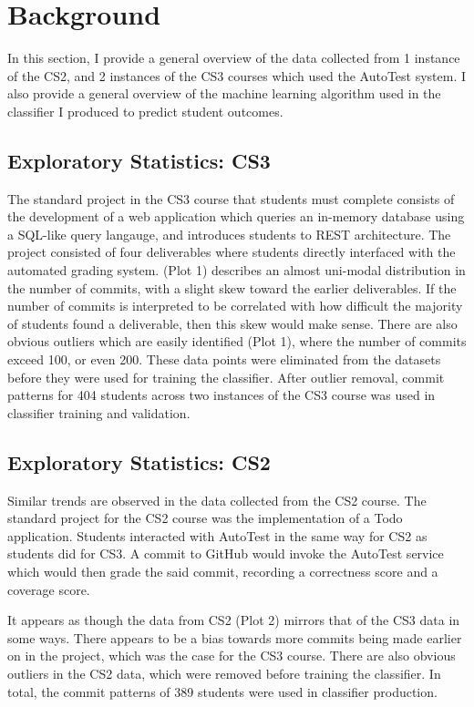 \documentclass[sigchi]{acmart}
\begin{document}
\section{Background}
In this section, I provide a general overview of the data collected from 1 instance of the CS2, and 2 instances of the CS3 courses which used the AutoTest system. I also provide a general overview of the machine learning algorithm used in the classifier I produced to predict student outcomes.

\subsection{Exploratory Statistics: CS3}

The standard project in the CS3 course that students must complete consists of the development of a web application which queries an in-memory database using a SQL-like query langauge, and introduces students to REST architecture. The project consisted of four deliverables where students directly interfaced with the automated grading system. (Plot 1) describes an almost uni-modal distribution in the number of commits, with a slight skew toward the earlier deliverables. If the number of commits is interpreted to be correlated with how difficult the majority of students found a deliverable, then this skew would make sense. There are also obvious outliers which are easily identified (Plot 1), where the number of commits exceed 100, or even 200. These data points were eliminated from the datasets before they were used for training the classifier. After outlier removal, commit patterns for 404 students across two instances of the CS3 course was used in classifier training and validation. 


\subsection{Exploratory Statistics: CS2}

Similar trends are observed in the data collected from the CS2 course. The standard project for the CS2 course was the implementation of a Todo application. Students interacted with AutoTest in the same way for CS2 as students did for CS3. A commit to GitHub would invoke the AutoTest service which would then grade the said commit, recording a correctness score and a coverage score.
\par It appears as though the data from CS2 (Plot 2) mirrors that of the CS3 data in some ways. There appears to be a bias towards more commits being made earlier on in the project, which was the case for the CS3 course. There are also obvious outliers in the CS2 data, which were removed before training the classifier. In total, the commit patterns of 389 students were used in classifier production. 
\end{document}
